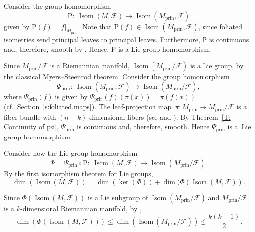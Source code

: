 \documentclass[10pt,a4paper]{amsart}
\numberwithin{equation}{section}
\theoremstyle{definition}
\DeclareMathOperator{\Iso}{Isom}
\newcommand{\prin}{\mathrm{prin}}
\newcommand{\fol}{\mathcal{F}}
\newcommand{\Rho}{\mathrm{P}}
\begin{document}
Consider the group homomorphism
\[
\Rho\colon \ \Iso(M,\fol)\to \Iso(M_{\prin},\fol)
\]
given by $\Rho(f) = f|_{M_{\prin}}$.
Note that $\Rho(f)\in \Iso(M_\prin,\fol)$, since foliated isometries send principal leaves to principal leaves.
Furthermore, $\Rho$ is continuous and, therefore, smooth by \cite[Corollary~3.50]{Hall2015}. Hence, $\Rho$ is a Lie group homomorphism.

Since $M_\prin/\fol$ is a Riemannian manifold, $\Iso(M_\prin/\fol)$ is a Lie group, by the classical Myers--Steenrod theorem.
Consider the group homomorphism
\[
\Psi_\prin\colon \ \Iso (M_\prin,\fol)\to\Iso (M_\prin/\fol),
\]
where $\Psi_\prin(f)$ is given by
$\Psi_\prin(f)(\pi(x)) = \pi(f(x))$ (cf.\ Section~\ref{s:foliated.maps}). The leaf-projection map~${\pi\colon M_{\prin}\to M_{\prin}/\fol}$ is a fiber bundle with $(n-k)$-dimensional fibers (see \cite[Theorem~A]{MendesRadeschi2019} and \cite[p.~41]{Corro}).
By Theorem~\ref{T: Continuity of psi}, $\Psi_\prin$ is continuous and, therefore, smooth. Hence $\Psi_\prin$ is a~Lie group homomorphism.

Consider now the Lie group homomorphism
\[
\Phi = \Psi_\prin\circ \Rho \colon \ \Iso(M,\fol) \to \Iso(M_\prin/\fol).
\]
By the first isomorphism theorem for Lie groups,
\begin{equation}
\label{eq:rank.nullity.Phi}
\dim(\Iso(M,\fol)) = \dim(\ker(\Phi)) + \dim(\Phi(\Iso(M,\fol)).
\end{equation}

Since $\Phi(\Iso(M,\fol))$ is a Lie subgroup of $\Iso(M_\prin/\fol)$ and $M_\prin/\fol$ is a $k$-dimensional Riemannian manifold, by \cite[Chapter~II, Theorem~3.1]{Kobayashi},
\begin{equation}
\label{eq:bound.dim.im.phi}
\dim(\Phi(\Iso(M,\fol)))\leq \dim(\Iso(M_\prin/\fol)) \leq \frac{k(k+1)}{2}.
\end{equation}
\end{document}
